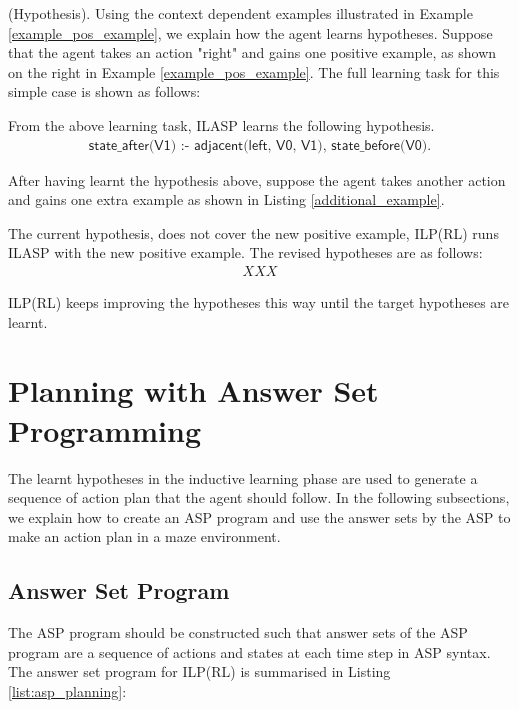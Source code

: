 \begin{examp} \normalfont (Hypothesis).
Using the context dependent examples illustrated in Example \ref{example_pos_example}, we explain how the agent learns hypotheses.
Suppose that the agent takes an action "right" and gains one positive example, as shown on the right in Example \ref{example_pos_example}. 
The full learning task for this simple case is shown as follows:


From the above learning task, ILASP learns the following hypothesis.
\begin{equation*}
\begin{split}
\textsf{state\_after(V1) :- adjacent(left, V0, V1), state\_before(V0).}
\end{split}
\end{equation*}

After having learnt the hypothesis above, suppose the agent takes another action and gains one extra example as shown in Listing \ref{additional_example}.


The current hypothesis, does not cover the new positive example, ILP(RL) runs ILASP with the new positive example. The revised hypotheses are as follows:
\begin{equation*}
\begin{split}
XXX
\end{split}
\end{equation*}

ILP(RL) keeps improving the hypotheses this way until the target hypotheses are learnt.
\end{examp}

\section{Planning with Answer Set Programming}
\label{sec:planning}
The learnt hypotheses in the inductive learning phase are used to generate a sequence of action plan that the agent should follow.
In the following subsections, we explain how to create an ASP program and use the answer sets by the ASP to make an action plan in a maze environment.
\subsection{Answer Set Program}
\label{subsec:answer_set_program}
The ASP program should be constructed such that answer sets of the ASP program are a sequence of actions and states at each time step in ASP syntax. 
The answer set program for ILP(RL) is summarised in Listing \ref{list:asp_planning}:



